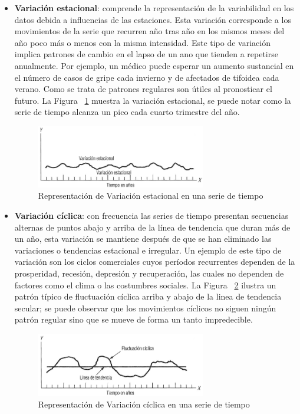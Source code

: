 \begin{itemize}
  \item{\textbf{Variación estacional}}: comprende la representación de la variabilidad en los datos debida a influencias de las estaciones. Esta variación
  corresponde a los movimientos de la serie que recurren año tras año en los mismos meses del año poco más o menos con la misma intensidad. Este tipo de variación
  implica patrones de cambio en el lapso de un ano que tienden a repetirse anualmente. Por ejemplo, un médico puede esperar un aumento sustancial en el número de 
  casos de gripe cada invierno y de afectados de tifoidea cada verano. Como se trata de patrones regulares son útiles al pronosticar el futuro. La Figura ~\ref{fig:tsc2} 
  muestra la variación estacional, se puede notar como la serie de tiempo alcanza un pico cada cuarto trimestre del año.
  \begin{figure}[htb]
    \centering 
    \includegraphics[width=0.7\textwidth]{pictures/tsc2.png}
    \caption{Representación de Variación estacional en una serie de tiempo}
    \label{fig:tsc2}
  \end{figure}
  
  \item{\textbf{Variación cíclica}}: con frecuencia las series de tiempo presentan secuencias alternas de puntos abajo y arriba de la línea de tendencia
  que duran más de un año, esta variación se mantiene después de que se han eliminado las variaciones o tendencias estacional e irregular. Un ejemplo 
  de este tipo de variación son los ciclos comerciales cuyos períodos recurrentes dependen de la prosperidad, recesión, depresión y recuperación,
  las cuales no dependen de factores como el clima o las costumbres sociales. La Figura ~\ref{fig:tsc3} ilustra un patrón típico de fluctuación cíclica arriba 
  y abajo de la linea de tendencia secular; se puede observar que los movimientos cíclicos no siguen ningún patrón regular sino que se mueve de forma un tanto 
  impredecible.
  \begin{figure}[htb]
    \centering 
    \includegraphics[width=0.7\textwidth]{pictures/tsc3.png}
    \caption{Representación de Variación cíclica en una serie de tiempo}
    \label{fig:tsc3}
  \end{figure}
  

\end{itemize}
